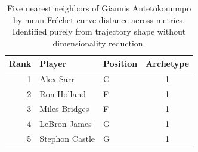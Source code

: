 \begin{table}[htbp]
  \centering\small
  \begin{tabular}{rllc}
    \toprule
    Rank & Player & Position & Archetype \\
    \midrule
    1 & Alex Sarr & C & 1 \\
    2 & Ron Holland & F & 1 \\
    3 & Miles Bridges & F & 1 \\
    4 & LeBron James & G & 1 \\
    5 & Stephon Castle & G & 1 \\
    \bottomrule
  \end{tabular}
  \caption{Five nearest neighbors of Giannis Antetokounmpo by mean Fr\'{e}chet curve distance across metrics. Identified purely from trajectory shape without dimensionality reduction.}
  \label{tab:Giannis_Antetokounmpo_frechet_curve_neighbors}
\end{table}

